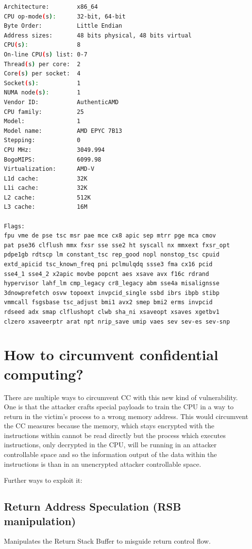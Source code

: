 \documentclass[11pt,a4paper]{article}
\begin{document}
\begin{lstlisting}[language=bash]
Architecture:        x86_64
CPU op-mode(s):      32-bit, 64-bit
Byte Order:          Little Endian
Address sizes:       48 bits physical, 48 bits virtual
CPU(s):              8
On-line CPU(s) list: 0-7
Thread(s) per core:  2
Core(s) per socket:  4
Socket(s):           1
NUMA node(s):        1
Vendor ID:           AuthenticAMD
CPU family:          25
Model:               1
Model name:          AMD EPYC 7B13
Stepping:            0
CPU MHz:             3049.994
BogoMIPS:            6099.98
Virtualization:      AMD-V
L1d cache:           32K
L1i cache:           32K
L2 cache:            512K
L3 cache:            16M

Flags:
fpu vme de pse tsc msr pae mce cx8 apic sep mtrr pge mca cmov 
pat pse36 clflush mmx fxsr sse sse2 ht syscall nx mmxext fxsr_opt 
pdpe1gb rdtscp lm constant_tsc rep_good nopl nonstop_tsc cpuid 
extd_apicid tsc_known_freq pni pclmulqdq ssse3 fma cx16 pcid 
sse4_1 sse4_2 x2apic movbe popcnt aes xsave avx f16c rdrand 
hypervisor lahf_lm cmp_legacy cr8_legacy abm sse4a misalignsse 
3dnowprefetch osvw topoext invpcid_single ssbd ibrs ibpb stibp 
vmmcall fsgsbase tsc_adjust bmi1 avx2 smep bmi2 erms invpcid 
rdseed adx smap clflushopt clwb sha_ni xsaveopt xsaves xgetbv1 
clzero xsaveerptr arat npt nrip_save umip vaes sev sev-es sev-snp
\end{lstlisting}

\section{How to circumvent confidential computing?}
There are multiple ways to circumvent CC with this new kind of vulnerability. One is that the attacker crafts special payloads to train the CPU in a way to return in the victim's process to a wrong memory address. This would circumvent the CC measures because the memory, which stays encrypted with the instructions within cannot be read directly but the process which executes instructions, only decrypted in the CPU, will be running in an attacker controllable space and so the information output of the data within the instructions is than in an unencrypted attacker controllable space.

Further ways to exploit it:
\subsection*{Return Address Speculation (RSB manipulation)}
Manipulates the Return Stack Buffer to misguide return control flow.
\end{document}
